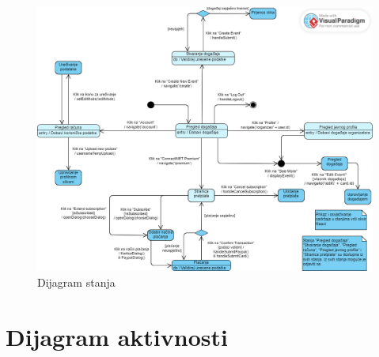 			\begin{figure}[htbp]
				\centering
				\includegraphics[width=1\textwidth]{dijagrami/dijagram_stanja.png}
				\caption{Dijagram stanja}
			\end{figure}
			
			\eject 
		
		\section{Dijagram aktivnosti}
			
			
